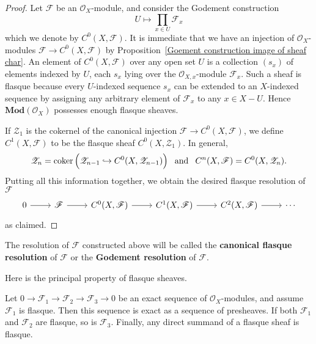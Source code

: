 \begin{proof}
Let $\mathscr{F}$ be an $\mathscr{O}_X$-module, and consider the Godement construction
\[U\mapsto\prod_{x\in U}\mathscr{F}_x\]
which we denote by $C^0(X,\mathscr{F})$. It is immediate that we have an injection of $\mathscr{O}_X$-modules $\mathscr{F}\to C^0(X,\mathscr{F})$ by Proposition~\ref{Goement construction image of sheaf char}. An element of $C^0(X,\mathscr{F})$ over any open set $U$ is a collection $(s_x)$ of elements indexed by $U$, each $s_x$ lying over the $\mathscr{O}_{X,x}$-module $\mathscr{F}_x$. Such a sheaf is flasque because every $U$-indexed sequence $s_x$ can be extended to an $X$-indexed sequence by assigning any arbitrary element of $\mathscr{F}_x$ to any $x\in X-U$. Hence $\mathbf{Mod}(\mathscr{O}_X)$ possesses enough flasque sheaves.\par
If $\mathscr{Z}_1$ is the cokernel of the canonical injection $\mathscr{F}\to C^0(X,\mathscr{F})$, we define $C^1(X,\mathscr{F})$ to be the flasque sheaf $C^0(X,\mathscr{Z}_1)$. In general, 
\[\mathscr{Z}_n=\operatorname{coker}\Big(\mathscr{Z}_{n-1}\hookrightarrow C^0(X,\mathscr{Z}_{n-1})\Big)\hspace{8pt}\text{and}\hspace{8pt} C^n(X,\mathscr{F})=C^0(X,\mathscr{Z}_n).\] Putting all this information together, we obtain the desired flasque resolution of $\mathscr{F}$
\[\begin{tikzcd}
0\ar[r]&\mathscr{F}\ar[r]&C^0(X,\mathscr{F})\ar[r]&C^1(X,\mathscr{F})\ar[r]&C^2(X,\mathscr{F})\ar[r]&\cdots
\end{tikzcd}\]
as claimed.
\end{proof}
\begin{remark}
The resolution of $\mathscr{F}$ constructed above will be called the \textbf{canonical flasque resolution} of $\mathscr{F}$ or the \textbf{Godement resolution} of $\mathscr{F}$.
\end{remark}
Here is the principal property of flasque sheaves.
\begin{theorem}\label{flasque sheaf prop}
Let $0\to\mathscr{F}_1\to\mathscr{F}_2\to\mathscr{F}_3\to 0$ be an exact sequence of $\mathscr{O}_X$-modules, and assume $\mathscr{F}_1$ is flasque. Then this sequence is exact as a sequence of presheaves. If both $\mathscr{F}_1$ and $\mathscr{F}_2$ are flasque, so is $\mathscr{F}_3$. Finally, any direct summand of a flasque sheaf is flasque.
\end{theorem}
